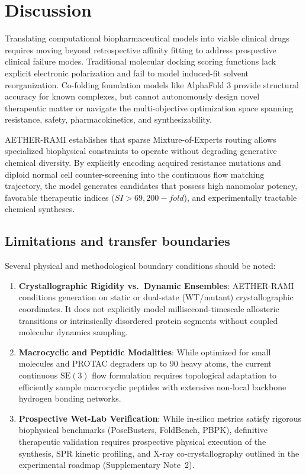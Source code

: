 \documentclass[11pt,a4paper]{article}
\begin{document}
\section*{Discussion}
Translating computational biopharmaceutical models into viable clinical drugs requires moving beyond retrospective affinity fitting to address prospective clinical failure modes. Traditional molecular docking scoring functions lack explicit electronic polarization and fail to model induced-fit solvent reorganization. Co-folding foundation models like AlphaFold 3 provide structural accuracy for known complexes, but cannot autonomously design novel therapeutic matter or navigate the multi-objective optimization space spanning resistance, safety, pharmacokinetics, and synthesizability.

AETHER-RAMI establishes that sparse Mixture-of-Experts routing allows specialized biophysical constraints to operate without degrading generative chemical diversity. By explicitly encoding acquired resistance mutations and diploid normal cell counter-screening into the continuous flow matching trajectory, the model generates candidates that possess high nanomolar potency, favorable therapeutic indices ($SI >69,200-fold$), and experimentally tractable chemical syntheses.

\subsection*{Limitations and transfer boundaries}
Several physical and methodological boundary conditions should be noted:
\begin{enumerate}
    \item \textbf{Crystallographic Rigidity vs.\ Dynamic Ensembles}: AETHER-RAMI conditions generation on static or dual-state (WT/mutant) crystallographic coordinates. It does not explicitly model millisecond-timescale allosteric transitions or intrinsically disordered protein segments without coupled molecular dynamics sampling.
    \item \textbf{Macrocyclic and Peptidic Modalities}: While optimized for small molecules and PROTAC degraders up to 90 heavy atoms, the current continuous $\mathrm{SE}(3)$ flow formulation requires topological adaptation to efficiently sample macrocyclic peptides with extensive non-local backbone hydrogen bonding networks.
    \item \textbf{Prospective Wet-Lab Verification}: While in-silico metrics satisfy rigorous biophysical benchmarks (PoseBusters, FoldBench, PBPK), definitive therapeutic validation requires prospective physical execution of the synthesis, SPR kinetic profiling, and X-ray co-crystallography outlined in the experimental roadmap (Supplementary Note~2).


\end{enumerate}
\end{document}
